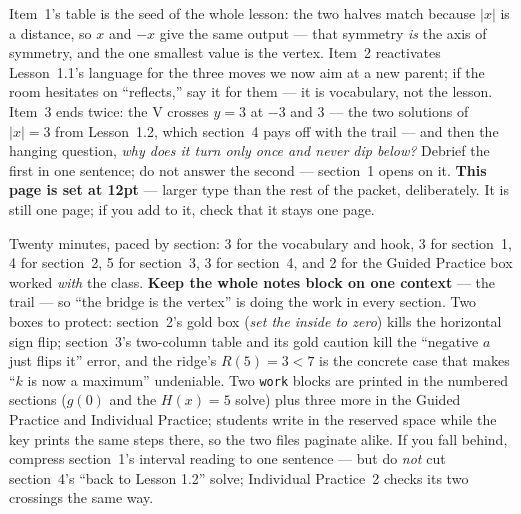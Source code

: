 \documentclass[10pt]{article}
\begin{document}
\begin{teachernote}[Warm-Up]
Item~1's table is the seed of the whole lesson: the two halves match because $|x|$ is a distance,
so $x$ and $-x$ give the same output --- that symmetry \emph{is} the axis of symmetry, and the one
smallest value is the vertex. Item~2 reactivates Lesson~1.1's language for the three moves we now
aim at a new parent; if the room hesitates on ``reflects,'' say it for them --- it is vocabulary,
not the lesson. Item~3 ends twice: the V crosses $y=3$ at $-3$ and $3$ --- the two solutions of
$|x|=3$ from Lesson~1.2, which section~4 pays off with the trail --- and then the hanging question,
\emph{why does it turn only once and never dip below?} Debrief the first in one sentence; do not
answer the second --- section~1 opens on it. \textbf{This page is set at 12pt} --- larger type than
the rest of the packet, deliberately. It is still one page; if you add to it, check that it stays
one page.
\end{teachernote}

\begin{teachernote}
Twenty minutes, paced by section: 3 for the vocabulary and hook, 3 for section~1, 4 for
section~2, 5 for section~3, 3 for section~4, and 2 for the Guided Practice box worked \emph{with}
the class. \textbf{Keep the whole notes block on one context} --- the trail --- so ``the bridge is
the vertex'' is doing the work in every section. Two boxes to protect: section~2's gold box
(\emph{set the inside to zero}) kills the horizontal sign flip; section~3's two-column table and
its gold caution kill the ``negative $a$ just flips it'' error, and the ridge's $R(5)=3<7$ is the
concrete case that makes ``$k$ is now a maximum'' undeniable. Two \texttt{work} blocks are printed
in the numbered sections ($g(0)$ and the $H(x)=5$ solve) plus three more in the Guided Practice
and Individual Practice; students write in the reserved space while the key prints the same steps
there, so the two files paginate alike. If you fall behind, compress section~1's interval reading
to one sentence --- but do \emph{not} cut section~4's ``back to Lesson 1.2'' solve; Individual
Practice~2 checks its two crossings the same way.
\end{teachernote}
\end{document}
